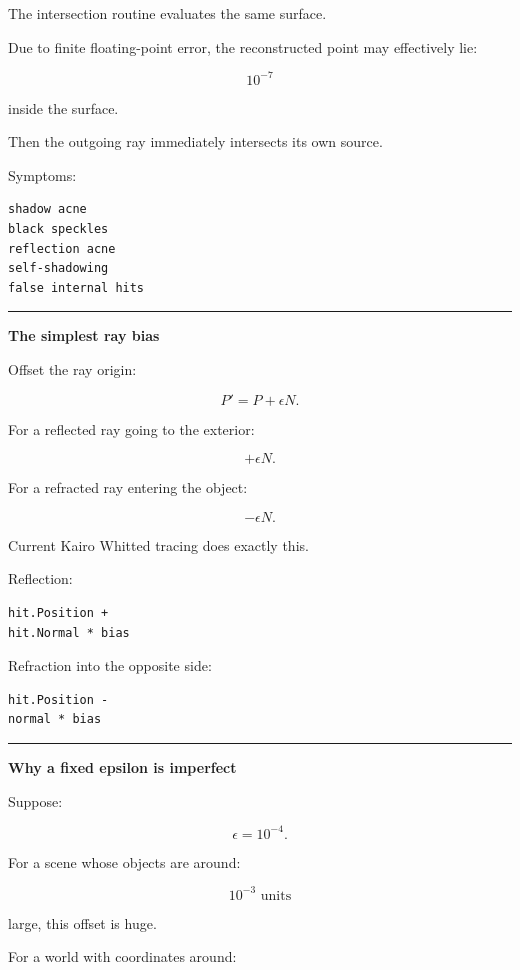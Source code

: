 The intersection routine evaluates the same surface.

Due to finite floating-point error, the reconstructed point may effectively lie:

\[
10^{-7}
\]

inside the surface.

Then the outgoing ray immediately intersects its own source.

Symptoms:

\begin{verbatim}
shadow acne
black speckles
reflection acne
self-shadowing
false internal hits
\end{verbatim}

\begin{center}\rule{0.5\linewidth}{0.5pt}\end{center}

\textbf{The simplest ray bias}

Offset the ray origin:

\[
\boxed{
P'=P+\epsilon N.
}
\]

For a reflected ray going to the exterior:

\[
+\epsilon N.
\]

For a refracted ray entering the object:

\[
-\epsilon N.
\]

Current Kairo Whitted tracing does exactly this.

Reflection:

\begin{verbatim}
hit.Position +
hit.Normal * bias
\end{verbatim}

Refraction into the opposite side:

\begin{verbatim}
hit.Position -
normal * bias
\end{verbatim}

\begin{center}\rule{0.5\linewidth}{0.5pt}\end{center}

\textbf{Why a fixed epsilon is imperfect}

Suppose:

\[
\epsilon=10^{-4}.
\]

For a scene whose objects are around:

\[
10^{-3}\text{ units}
\]

large, this offset is huge.

For a world with coordinates around:

